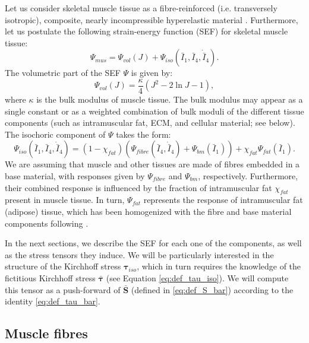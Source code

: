 \documentclass{sfuthesis}
\numberwithin{equation}{section}
\numberwithin{figure}{chapter}
\numberwithin{table}{chapter}
\theoremstyle{definition}
\def\*#1{{\mathbf{#1}}} %
\newcommand{\I}{{\bar{I}}}
\def\btau{{\bm{\tau}}}
\begin{document}
Let us consider skeletal muscle tissue as a fibre-reinforced (i.e. transversely isotropic), composite, nearly incompressible hyperelastic material \cite{Seba, Hadi, Paper1_WakelingEtAl2020}. Furthermore, let us postulate the following strain-energy function (SEF) for skeletal muscle tissue:
\begin{equation}
    \Psi_{mus} = \Psi_{vol}(J) + \Psi_{iso}(\I_1, \I_4, \dot{\I}_4).
\end{equation}
The volumetric part of the SEF $\Psi$ is given by:
\begin{equation} 
    \Psi_{vol}(J) = \dfrac{\kappa}{4} \left( J^2 - 2\ln J - 1 \right),
\end{equation}
where $\kappa$ is the bulk modulus of muscle tissue. The bulk modulus may appear as a single constant or as a weighted combination of bulk moduli of the different tissue components (such as intramuscular fat, ECM, and cellular material; see below). The isochoric component of $\Psi$ takes the form:
\begin{equation} \label{eq:def_Psi_iso_fibre_bm_fat}
    \Psi_{iso}(\I_1, \I_4, \dot{\I}_4) = (1-\chi_{fat}) \left( \Psi_{fibre}(\I_4, \dot{\I}_4) + \Psi_{bm}(\I_1) \right) + \chi_{fat} \Psi_{fat}(\I_1).
\end{equation}
We are assuming that muscle and other tissues are made of fibres embedded in a base material, with responses given by $\Psi_{fibre}$ and $\Psi_{bm}$, respectively. Furthermore, their combined response is influenced by the fraction of intramuscular fat $\chi_{fat}$ present in muscle tissue. In turn, $\Psi_{fat}$ represents the response of intramuscular fat (adipose) tissue, which has been homogenized with the fibre and base material components following \cite[Model M4]{RahemiNigamWakeling2015}.

In the next sections, we describe the SEF for each one of the components, as well as the stress tensors they induce. We will be particularly interested in the structure of the Kirchhoff stress $\btau_{iso}$, which in turn requires the knowledge of the fictitious Kirchhoff stress $\bar{\btau}$ (see Equation \eqref{eq:def_tau_iso}). We will compute this tensor as a push-forward of $\bar{\*S}$ (defined in \eqref{eq:def_S_bar}) according to the identity \eqref{eq:def_tau_bar}.

\subsection{Muscle fibres}
\end{document}
